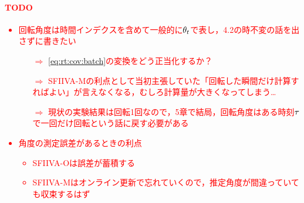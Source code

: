 \documentclass[sip,biber]{now-journal}
\newcommand{\todo}[1]{\textcolor{red}{#1}}
\begin{document}
\todo{%
  \paragraph{TODO}
  \begin{itemize}
    \item 回転角度は時間インデクスを含めて一般的に$\theta _{t}$で表し，4.2の時不変の話を出さずに書きたい
    \begin{itemize}
      \item[$\Rightarrow$] \eqref{eq:rt:cov:batch}の変換をどう正当化するか？
      \item[$\Rightarrow$] SFIIVA-Mの利点として当初主張していた「回転した瞬間だけ計算すればよい」が言えなくなる，むしろ計算量が大きくなってしまう…
      \item[$\Rightarrow$] 現状の実験結果は回転1回なので，5章で結局，回転角度はある時刻$\tau$で一回だけ回転という話に戻す必要がある
    \end{itemize}
  \item 角度の測定誤差があるときの利点
    \begin{itemize}
      \item SFIIVA-Oは誤差が蓄積する
      \item SFIIVA-Mはオンライン更新で忘れていくので，推定角度が間違っていても収束するはず
    \end{itemize}
\end{itemize}
}
\end{document}
